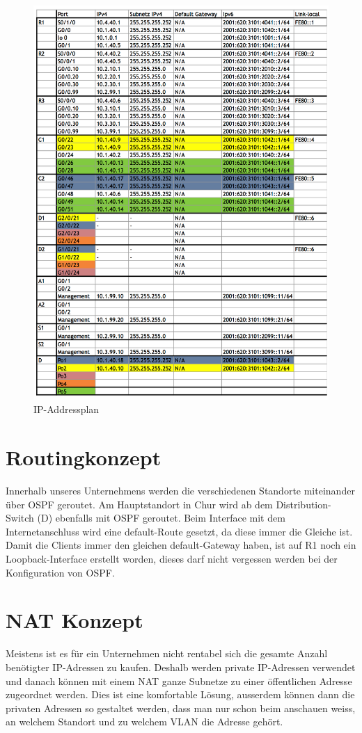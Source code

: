 \documentclass[11pt,a4paper]{scrreprt}
\begin{document}
\begin{figure} [H]
\centering
\includegraphics[angle=0,scale=0.4]{Iuk_III_U_addressplan.png}
\caption{IP-Addressplan}
\label{abb: IP-Addressplan}
\end{figure}


\section{Routingkonzept} 
Innerhalb unseres Unternehmens werden die verschiedenen Standorte miteinander über OSPF geroutet. Am Hauptstandort in Chur wird ab dem Distribution-Switch (D) ebenfalls mit OSPF geroutet. Beim Interface mit dem Internetanschluss wird eine default-Route gesetzt, da diese immer die Gleiche ist. Damit die Clients immer den gleichen default-Gateway haben, ist auf R1 noch ein Loopback-Interface erstellt worden, dieses darf nicht vergessen werden bei der Konfiguration von OSPF.

\section{NAT Konzept}
Meistens ist es für ein Unternehmen nicht rentabel sich die gesamte Anzahl benötigter IP-Adressen zu  kaufen. Deshalb werden private IP-Adressen verwendet und danach können mit einem \acs{NAT} ganze Subnetze zu einer öffentlichen Adresse zugeordnet werden. Dies ist eine komfortable Lösung, ausserdem können dann die privaten Adressen so gestaltet werden, dass man nur schon beim anschauen weiss, an welchem Standort und zu welchem \acs{VLAN} die Adresse gehört.
\end{document}
